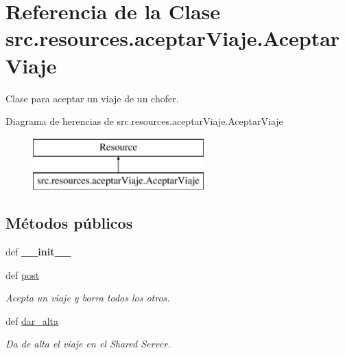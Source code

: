 \hypertarget{classsrc_1_1resources_1_1aceptar_viaje_1_1_aceptar_viaje}{\section{Referencia de la Clase src.\-resources.\-aceptar\-Viaje.\-Aceptar\-Viaje}
\label{classsrc_1_1resources_1_1aceptar_viaje_1_1_aceptar_viaje}
}


Clase para aceptar un viaje de un chofer.  


Diagrama de herencias de src.\-resources.\-aceptar\-Viaje.\-Aceptar\-Viaje\begin{figure}[H]
\begin{center}
\leavevmode
\includegraphics[height=2.000000cm]{classsrc_1_1resources_1_1aceptar_viaje_1_1_aceptar_viaje}
\end{center}
\end{figure}
\subsection*{Métodos públicos}
\begin{DoxyCompactItemize}
\item 
\hypertarget{classsrc_1_1resources_1_1aceptar_viaje_1_1_aceptar_viaje_aa0409475ce903baca3b2aefbb48d0e61}{def {\bfseries \-\_\-\-\_\-init\-\_\-\-\_\-}}\label{classsrc_1_1resources_1_1aceptar_viaje_1_1_aceptar_viaje_aa0409475ce903baca3b2aefbb48d0e61}

\item 
def \hyperlink{classsrc_1_1resources_1_1aceptar_viaje_1_1_aceptar_viaje_a83eb87e969accc14f808c6af720f75e1}{post}
\begin{DoxyCompactList}\small\item\em Acepta un viaje y borra todos los otros. \end{DoxyCompactList}\item 
def \hyperlink{classsrc_1_1resources_1_1aceptar_viaje_1_1_aceptar_viaje_a03e5a5b1e3010f3dcdbe9e9af815c0d4}{dar\-\_\-alta}
\begin{DoxyCompactList}\small\item\em Da de alta el viaje en el Shared Server. \end{DoxyCompactList}\end{DoxyCompactItemize}
